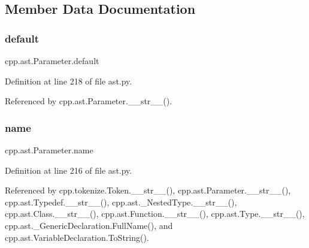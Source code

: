 \subsection{Member Data Documentation}
\mbox{\label{classcpp_1_1ast_1_1Parameter_a4ceae2ac87d82c5542c4e7385eb4c97e}} 
\subsubsection{\texorpdfstring{default}{default}}
{\footnotesize\ttfamily cpp.\+ast.\+Parameter.\+default}



Definition at line 218 of file ast.\+py.



Referenced by cpp.\+ast.\+Parameter.\+\_\+\+\_\+str\+\_\+\+\_\+().

\mbox{\label{classcpp_1_1ast_1_1Parameter_aae0375fb0ded8fa9090feea6bdff2784}} 
\subsubsection{\texorpdfstring{name}{name}}
{\footnotesize\ttfamily cpp.\+ast.\+Parameter.\+name}



Definition at line 216 of file ast.\+py.



Referenced by cpp.\+tokenize.\+Token.\+\_\+\+\_\+str\+\_\+\+\_\+(), cpp.\+ast.\+Parameter.\+\_\+\+\_\+str\+\_\+\+\_\+(), cpp.\+ast.\+Typedef.\+\_\+\+\_\+str\+\_\+\+\_\+(), cpp.\+ast.\+\_\+\+Nested\+Type.\+\_\+\+\_\+str\+\_\+\+\_\+(), cpp.\+ast.\+Class.\+\_\+\+\_\+str\+\_\+\+\_\+(), cpp.\+ast.\+Function.\+\_\+\+\_\+str\+\_\+\+\_\+(), cpp.\+ast.\+Type.\+\_\+\+\_\+str\+\_\+\+\_\+(), cpp.\+ast.\+\_\+\+Generic\+Declaration.\+Full\+Name(), and cpp.\+ast.\+Variable\+Declaration.\+To\+String().

\mbox{\label{classcpp_1_1ast_1_1Parameter_a5eed090000c41551a10c21f175ad33e3}} 
